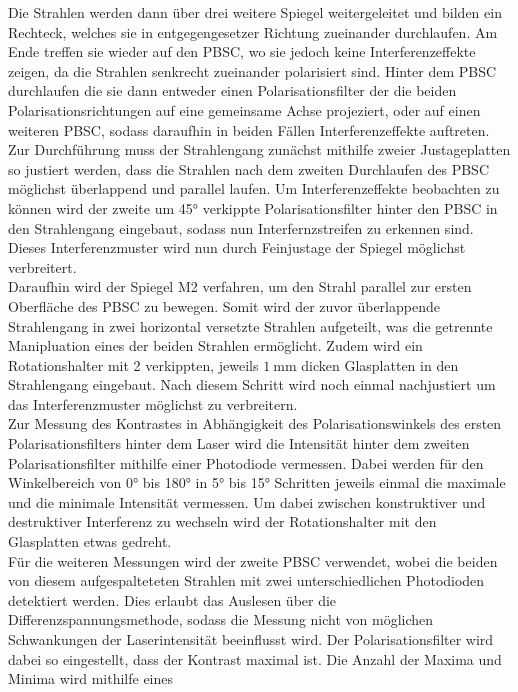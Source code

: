 Die Strahlen werden dann über drei weitere Spiegel weitergeleitet und bilden ein Rechteck, welches
sie in entgegengesetzer Richtung zueinander durchlaufen. Am Ende treffen sie wieder auf den
PBSC, wo sie jedoch keine Interferenzeffekte zeigen, da die Strahlen senkrecht zueinander polarisiert sind.
Hinter dem PBSC durchlaufen die sie dann entweder einen Polarisationsfilter der die beiden
Polarisationsrichtungen auf eine gemeinsame Achse projeziert, oder auf einen weiteren PBSC,
sodass daraufhin in beiden Fällen Interferenzeffekte auftreten.\\
Zur Durchführung muss der Strahlengang zunächst mithilfe zweier Justageplatten so justiert werden,
dass die Strahlen nach dem zweiten Durchlaufen des PBSC möglichst überlappend und parallel laufen.
Um Interferenzeffekte beobachten zu können wird der zweite um 45° verkippte
Polarisationsfilter hinter den PBSC in den
Strahlengang eingebaut, sodass nun Interfernzstreifen zu erkennen sind. Dieses Interferenzmuster
wird nun durch Feinjustage der Spiegel möglichst verbreitert.\\
Daraufhin wird der Spiegel M2 verfahren, um den Strahl parallel zur ersten Oberfläche des PBSC zu bewegen.
Somit wird
der zuvor überlappende Strahlengang in zwei horizontal versetzte Strahlen aufgeteilt, was die getrennte
Manipluation eines der beiden Strahlen ermöglicht. Zudem
wird ein Rotationshalter mit 2 verkippten, jeweils $\SI{1}{\milli\metre}$ dicken Glasplatten
in den Strahlengang eingebaut.
Nach diesem Schritt wird noch einmal nachjustiert um
das Interferenzmuster möglichst zu verbreitern.\\
Zur Messung des Kontrastes in Abhängigkeit des Polarisationswinkels des ersten
Polarisationsfilters hinter dem Laser wird die Intensität hinter dem zweiten
Polarisationsfilter mithilfe einer Photodiode vermessen. Dabei werden für den Winkelbereich von
0° bis 180° in 5° bis 15° Schritten jeweils einmal die maximale und die minimale Intensität vermessen. Um dabei
zwischen konstruktiver und destruktiver Interferenz zu wechseln wird der Rotationshalter mit den Glasplatten
etwas gedreht. \\
Für die weiteren Messungen wird der zweite PBSC verwendet, wobei die beiden von diesem aufgespalteteten Strahlen mit zwei unterschiedlichen
Photodioden detektiert werden. Dies erlaubt das Auslesen über die Differenzspannungsmethode,
sodass die Messung nicht von möglichen Schwankungen der Laserintensität beeinflusst wird.
Der Polarisationsfilter wird dabei so eingestellt,
dass der Kontrast maximal ist. Die Anzahl der Maxima und Minima wird mithilfe eines
